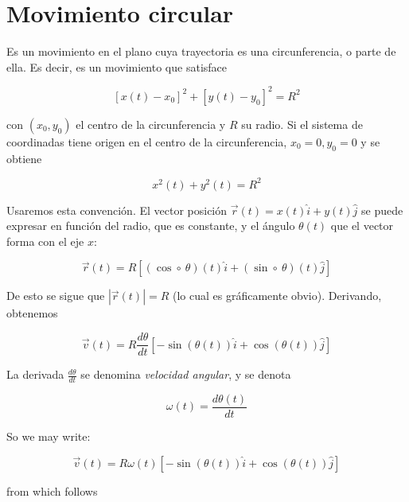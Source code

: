 \documentclass[12pt]{article}
\theoremstyle{definition}
\begin{document}
\section{Movimiento circular}

Es un movimiento en el plano cuya trayectoria es una circunferencia, o parte de
ella. Es decir, es un movimiento que satisface 

\begin{equation}
    \left[ x(t) - x_0 \right]^2 + \left[ y(t) - y_0 \right]^2 = R^2
\end{equation}

con $(x_0, y_0)$ el centro de la circunferencia y $R$ su radio. Si el sistema de
coordinadas tiene origen en el centro de la circunferencia, $x_0 = 0, y_0 = 0$ y 
se obtiene

\begin{equation}
    x^2(t) + y^2(t) = R^2
\end{equation}

Usaremos esta convención. El vector posición $\vec{r}(t) = x(t) \hat{i} + y(t)
\hat{j}$ se puede expresar en función del
radio, que es constante, y el ángulo $\theta(t)$ que el vector forma con el eje 
$x$: 

\begin{equation}
    \vec{r}(t) = R \left[ ( \cos \circ ~ \theta )(t) \hat{i} + (\sin \circ
    ~ \theta)(t) \hat{j} \right] 
\end{equation}

De esto se sigue que $\left| \vec{r}(t) \right| = R$ (lo cual es gráficamente
obvio). Derivando, obtenemos 

\begin{equation}
    \vec{v}(t) = R \frac{d\theta}{dt} \left[ - \sin\left( \theta(t)
    \right)\hat{i} + \cos \left( \theta(t) \right) \hat{j} \right] 
\end{equation}

La derivada $\frac{d\theta}{dt}$ se denomina \textit{velocidad angular}, y se
denota 

\begin{equation*}
    \omega(t) = \frac{d\theta(t)}{dt}
\end{equation*}

So we may write: 

\begin{equation}
    \vec{v}(t) = R \omega(t) \left[ -\sin(\theta(t)) \hat{i} + \cos(\theta(t))
    \hat{j} \right]
\end{equation}

from which follows 
\end{document}
